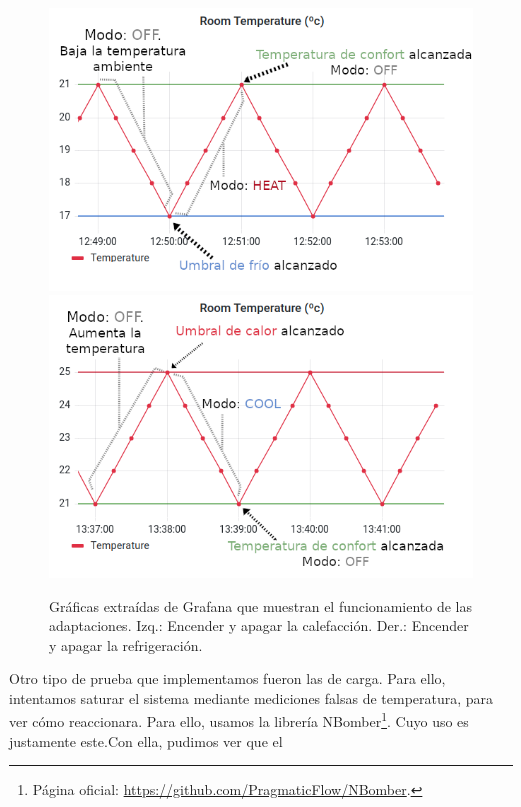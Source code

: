 \begin{figure}[h]
  \hspace{-1.2cm}
  \includegraphics[scale=0.42]{cap_despliegue/images/pruebas-temperatura-calentar}
  \includegraphics[scale=0.42]{cap_despliegue/images/pruebas-temperatura-enfriar}
  \caption{Gráficas extraídas de Grafana que muestran el funcionamiento de las adaptaciones. Izq.: Encender y apagar la calefacción. Der.: Encender y apagar la refrigeración.}
  \label{fig:pruebas-temperatura}
\end{figure}

Otro tipo de prueba que implementamos fueron las de carga. Para ello, intentamos saturar el sistema mediante mediciones falsas de temperatura, para ver cómo reaccionara. Para ello, usamos la librería NBomber\footnote{Página oficial: \url{https://github.com/PragmaticFlow/NBomber}.}. Cuyo uso es justamente este.Con ella, pudimos ver que el

